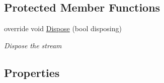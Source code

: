 \subsection*{Protected Member Functions}
\begin{DoxyCompactItemize}
\item 
override void \mbox{\hyperlink{class_super_tiled2_unity_1_1_ionic_1_1_zip_1_1_zip_output_stream_ac792f46e1b4cde3da0aa1eaf4ad28db4}{Dispose}} (bool disposing)
\begin{DoxyCompactList}\small\item\em Dispose the stream \end{DoxyCompactList}\end{DoxyCompactItemize}
\subsection*{Properties}

